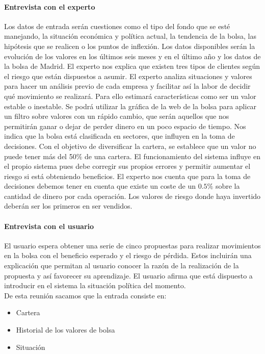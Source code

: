\documentclass[11pt,leqno]{article}
\theoremstyle{definition_wo_parentheses}
\theoremstyle{plain}
\theoremstyle{remark}
\begin{document}
\paragraph{Entrevista con el experto} Los datos de entrada serán cuestiones como el tipo del fondo que se esté manejando, la situación económica y política actual, la tendencia de la bolsa, las hipótesis que se realicen o los puntos de inflexión. Los datos disponibles serán la evolución de los valores en los últimos seis meses y en el último año y los datos de la bolsa de Madrid. El experto nos explica que existen tres tipos de clientes según el riesgo que están dispuestos a asumir. El experto analiza situaciones y valores para hacer un análisis previo de cada empresa y facilitar así la labor de decidir qué movimiento se realizará. Para ello estimará características como ser un valor estable o inestable. Se podrá utilizar la gráfica de la web de la bolsa para aplicar un filtro sobre valores con un rápido cambio, que serán aquellos que nos permitirán ganar o dejar de perder dinero en un poco espacio de tiempo. Nos indica que la bolsa está clasificada en sectores, que influyen en la toma de decisiones. Con el objetivo de diversificar la cartera, se establece que un valor no puede tener más del 50$\%$ de una cartera. El funcionamiento del sistema influye en el propio sistema pues debe corregir sus propios errores y permitir aumentar el riesgo si está obteniendo beneficios. El experto nos cuenta que para la toma de decisiones debemos tener en cuenta que existe un coste de un $0.5\%$ sobre la cantidad de dinero por cada operación. Los valores de riesgo donde haya invertido deberán ser los primeros en ser vendidos. 

\paragraph{Entrevista con el usuario} El usuario espera obtener una serie de cinco propuestas para realizar movimientos en la bolsa con el beneficio esperado y el riesgo de pérdida. Estos incluirán una explicación que permitan al usuario conocer la razón de la realización de la propuesta y así favorecer su aprendizaje. El usuario afirma que está dispuesto a introducir en el sistema la situación política del momento.\\


De esta reunión sacamos que la entrada consiste en:
\begin{itemize}
\item Cartera
\item Historial de los valores de bolsa
\item Situación
\end{itemize}
\end{document}
